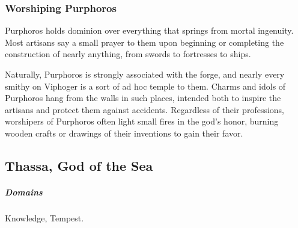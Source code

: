     \subsubsection{Worshiping Purphoros}
        Purphoros holds dominion over everything that springs from mortal ingenuity.
        Most artisans say a small prayer to them upon beginning or completing the construction of nearly anything, from swords to fortresses to ships.

        Naturally, Purphoros is strongly associated with the forge, and nearly every smithy on Viphoger is a sort of ad hoc temple to them.
        Charms and idols of Purphoros hang from the walls in such places, intended both to inspire the artisans and protect them against accidents.
        Regardless of their professions, worshipers of Purphoros often light small fires in the god's honor, burning wooden crafts or drawings of their inventions to gain their favor.

\pagebreak


\vspace{15.0cm}

\subsection*{Thassa, God of the Sea} \label{ssec::thassa}
    \subparagraph{Domains} Knowledge, Tempest.

